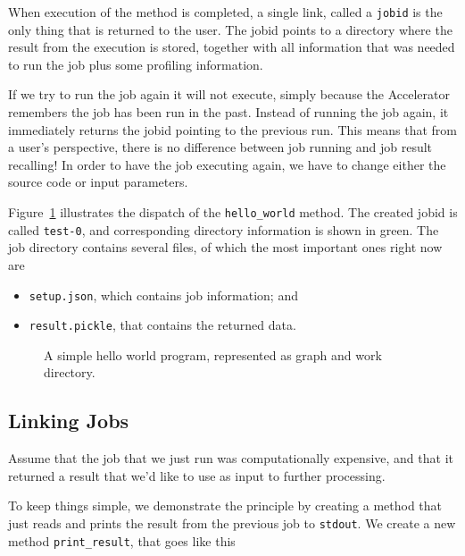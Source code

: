 \documentclass[a4paper]{article}
\begin{document}
When execution of the method is completed, a single link, called a
\texttt{jobid} is the only thing that is returned to the user.  The
jobid points to a directory where the result from the execution is
stored, together with all information that was needed to run the job
plus some profiling information.

If we try to run the job again it will not execute, simply because the
Accelerator remembers the job has been run in the past.  Instead of
running the job again, it immediately returns the jobid pointing to
the previous run.  This means that from a user's perspective, there is
no difference between job running and job result recalling!  In order
to have the job executing again, we have to change either the source
code or input parameters.

Figure~\ref{fig:execflow-hello-world} illustrates the dispatch of the
\texttt{hello\_world} method.  The created jobid is called
\texttt{test-0}, and corresponding directory information is shown in
green.  The job directory contains several files, of which the most
important ones right now are
\begin{itemize}
  \item[] \texttt{setup.json}, which contains job information; and
  \item[] \texttt{result.pickle}, that contains the returned data.
\end{itemize}

\begin{figure}[h!]
  \begin{center}
    
    \caption{A simple hello world program, represented as graph and
      work directory.}
    \label{fig:execflow-hello-world}
  \end{center}
\end{figure}

\clearpage





\subsection{Linking Jobs}
Assume that the job that we just run was computationally expensive,
and that it returned a result that we'd like to use as input to further
processing.

To keep things simple, we demonstrate the principle by creating a
method that just reads and prints the result from the previous job to
\texttt{stdout}.  We create a new method \texttt{print\_result}, that
goes like this
\end{document}
